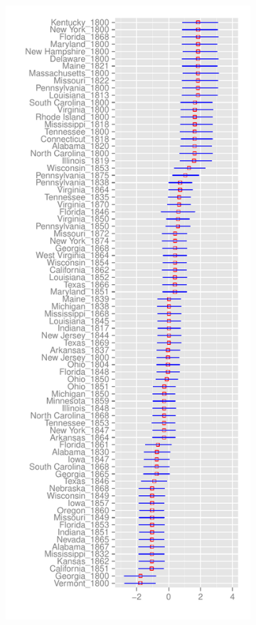 \documentclass[12pt]{article}
\begin{document}
\begin{figure}
	\centering	\caption{Regime Change Specification- Parameter Means}\label{regime_parametermean}
	\begin{subfigure}{.5\textwidth}
		\centering
		\includegraphics[height=\textheight]{graphics/regime/regime_param_mean_first_ggplot.pdf}

\end{subfigure}
\end{figure}
\end{document}
